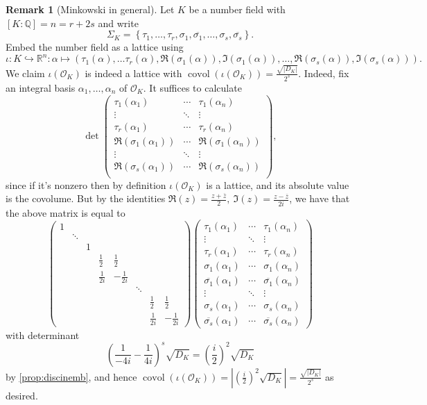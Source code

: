 \documentclass{article}
\newcommand{\Q}{\mathbb{Q}}
\newcommand{\R}{\mathbb{R}}
\newcommand{\covol}{\operatorname{covol}}
\newcommand{\ri}{\mathcal{O}}
\theoremstyle{definition}
\newtheorem{remark}[defn]{Remark}
\begin{document}
\begin{remark}[Minkowski in general]
Let $K$ be a number field with $[K:\Q]=n=r+2s$ and write
\[
\Sigma_K=\left\{\tau_1,\ldots,\tau_r,\sigma_1,\overline{\sigma_1},\ldots,\sigma_s,\overline{\sigma_s}\right\}.
\]
Embed the number field as a lattice using
\[
\iota:K\hookrightarrow\R^n:\alpha\mapsto\left(\tau_1(\alpha),\ldots\tau_r(\alpha),\Re(\sigma_1(\alpha)),\Im(\sigma_1(\alpha)),\ldots,\Re(\sigma_s(\alpha)),\Im(\sigma_s(\alpha))\right).
\]
We claim $\iota(\ri_K)$ is indeed a lattice with $\covol(\iota(\ri_K))=\frac{\sqrt{|D_K|}}{2^s}$. Indeed, fix an integral basis $\alpha_1,\ldots,\alpha_n$ of $\ri_K$. It suffices to calculate
\[
\det\begin{pmatrix}
\tau_1(\alpha_1) & \cdots & \tau_1(\alpha_n) \\
\vdots & \ddots & \vdots \\
\tau_r(\alpha_1) & \cdots & \tau_r(\alpha_n) \\
\Re(\sigma_1(\alpha_1)) & \cdots & \Re(\sigma_1(\alpha_n)) \\
\vdots & \ddots & \vdots \\
\Re(\sigma_s(\alpha_1)) & \cdots & \Re(\sigma_s(\alpha_n)) \\
\end{pmatrix},
\]
since if it's nonzero then by definition $\iota(\ri_K)$ is a lattice, and its absolute value is the covolume. But by the identities $\Re(z)=\frac{z+\overline z}{2},\ \Im(z)=\frac{z-\overline z}{2i}$, we have that the above matrix is equal to
\[
\begin{pmatrix}
1 & \\ & \ddots \\ & & 1 \\ & & & \frac 12 & \frac 12 \\ & & & \frac{1}{2i} & -\frac{1}{2i} \\ & & & & & \ddots \\ & & & & & &  \frac 12 & \frac 12 \\ & & & & & & \frac{1}{2i} & -\frac{1}{2i}
\end{pmatrix}\begin{pmatrix}
\tau_1(\alpha_1) & \cdots & \tau_1(\alpha_n) \\
\vdots & \ddots & \vdots \\
\tau_r(\alpha_1) & \cdots & \tau_r(\alpha_n) \\
\sigma_1(\alpha_1) & \cdots & \sigma_1(\alpha_n) \\
\overline{\sigma_1}(\alpha_1) & \cdots & \overline{\sigma_1}(\alpha_n) \\
\vdots & \ddots & \vdots \\
\sigma_s(\alpha_1) & \cdots & \sigma_s(\alpha_n) \\
\overline{\sigma_s}(\alpha_1) & \cdots & \overline{\sigma_s}(\alpha_n) 
\end{pmatrix}
\]
with determinant
\[
\left(\frac{1}{-4i}-\frac{1}{4i}\right)^s\sqrt{D_K}=\left(\frac{i}{2}\right)^2\sqrt{D_K}
\]
by \ref{prop:discinemb}, and hence $\covol(\iota(\ri_K))=\left|\left(\frac{i}{2}\right)^2\sqrt{D_K}\right|=\frac{\sqrt{|D_K|}}{2^s}$ as desired.


\end{remark}
\end{document}
